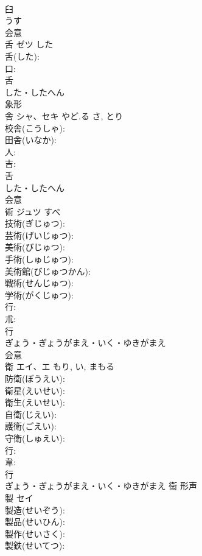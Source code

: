 \documentclass[8pt]{extreport}
\begin{document}
\begin{CJK}{UTF8}{min}
\\	臼	
\\	うす	
\\	会意 
\\	舌	ゼツ	した		
\\	舌(した): 
\\	口: 
\\	舌	
\\	した・したへん	
\\	象形 
\\	舎	シャ、セキ	やど.る	さ, とり	
\\	校舎(こうしゃ): 
\\	田舎(いなか): 
\\	人: 
\\	吉: 
\\	舌	
\\	した・したへん	
\\	会意 
\\	術	ジュツ	すべ		
\\	技術(ぎじゅつ): 
\\	芸術(げいじゅつ): 
\\	美術(びじゅつ): 
\\	手術(しゅじゅつ): 
\\	美術館(びじゅつかん): 
\\	戦術(せんじゅつ): 
\\	学術(がくじゅつ): 
\\	行: 
\\	朮: 
\\	行	
\\	ぎょう・ぎょうがまえ・いく・ゆきがまえ	
\\	会意 
\\	衛	エイ、エ		もり, い, まもる	
\\	防衛(ぼうえい): 
\\	衛星(えいせい): 
\\	衛生(えいせい): 
\\	自衛(じえい): 
\\	護衛(ごえい): 
\\	守衛(しゅえい): 
\\	行: 
\\	韋: 
\\	行	
\\	ぎょう・ぎょうがまえ・いく・ゆきがまえ	衞	形声 
\\	製	セイ			
\\	製造(せいぞう): 
\\	製品(せいひん): 
\\	製作(せいさく): 
\\	製鉄(せいてつ): 

\end{CJK}
\end{document}
